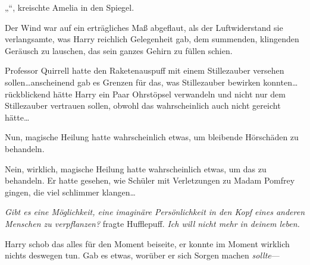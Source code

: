 \later

„“, kreischte Amelia in den Spiegel.

\later

Der Wind war auf ein erträgliches Maß abgeflaut, als der Luftwiderstand sie verlangsamte, was Harry reichlich Gelegenheit gab, dem summenden, klingenden Geräusch zu lauschen, das sein ganzes Gehirn zu füllen schien.

Professor Quirrell hatte den Raketenauspuff mit einem Stillezauber versehen sollen…anscheinend gab es Grenzen für das, was Stillezauber bewirken konnten…rückblickend hätte Harry ein Paar Ohrstöpsel verwandeln und nicht nur dem Stillezauber vertrauen sollen, obwohl das wahrscheinlich auch nicht gereicht hätte…

Nun, magische Heilung hatte wahrscheinlich etwas, um bleibende Hörschäden zu behandeln.

Nein, wirklich, magische Heilung hatte wahrscheinlich etwas, um das zu behandeln. Er hatte gesehen, wie Schüler mit Verletzungen zu Madam Pomfrey gingen, die viel schlimmer klangen…

\emph{Gibt es eine Möglichkeit, eine imaginäre Persönlichkeit in den Kopf eines anderen Menschen zu verpflanzen?} fragte Hufflepuff. \emph{Ich will nicht mehr in deinem leben.}

Harry schob das alles für den Moment beiseite, er konnte im Moment wirklich nichts deswegen tun. Gab es etwas, worüber er sich Sorgen machen \emph{sollte}—


